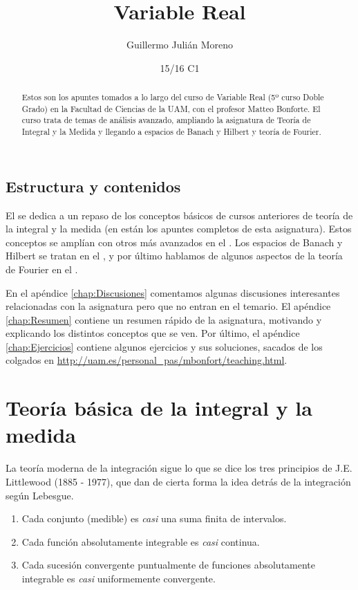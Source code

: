 \documentclass[palatino]{apuntes}
\title{Variable Real}
\author{Guillermo Julián Moreno}
\date{15/16 C1}
\begin{document}
\pagestyle{plain}

\begin{abstract}
Estos son los apuntes tomados a lo largo del curso de Variable Real (5º curso Doble Grado) en la Facultad de Ciencias de la UAM, con el profesor Matteo Bonforte. El curso trata de temas de análisis avanzado, ampliando la asignatura de Teoría de Integral y la Medida \citep{ApuntesTIM} y llegando a espacios de Banach y Hilbert y teoría de Fourier.
\end{abstract}

\maketitle
\section*{Estructura y contenidos}

El  se dedica a un repaso de los conceptos básicos de cursos anteriores de teoría de la integral y la medida (en \citep{ApuntesTIM} están los apuntes completos de esta asignatura). Estos conceptos se amplían con otros más avanzados en el . Los espacios de Banach y Hilbert se tratan en el , y por último hablamos de algunos aspectos de la teoría de Fourier en el .

En el apéndice \ref{chap:Discusiones} comentamos algunas discusiones interesantes relacionadas con la asignatura pero que no entran en el temario. El apéndice \ref{chap:Resumen} contiene un resumen rápido de la asignatura, motivando y explicando los distintos conceptos que se ven. Por último, el apéndice \ref{chap:Ejercicios} contiene algunos ejercicios y sus soluciones, sacados de los colgados en \url{http://uam.es/personal_pas/mbonfort/teaching.html}.

\tableofcontents

\chapter{Teoría básica de la integral y la medida}
\label{chap:TeoriaBasicaIntegral}

La teoría moderna de la integración sigue lo que se dice los tres principios de J.E. Littlewood (1885 - 1977), que dan de cierta forma la idea detrás de la integración según Lebesgue.

\begin{enumerate}
\item Cada conjunto (medible) es \textit{casi} una suma finita de intervalos.
\item Cada función absolutamente integrable es \textit{casi} continua.
\item Cada sucesión convergente puntualmente de funciones absolutamente integrable es \textit{casi} uniformemente convergente.
\end{enumerate}
\end{document}
